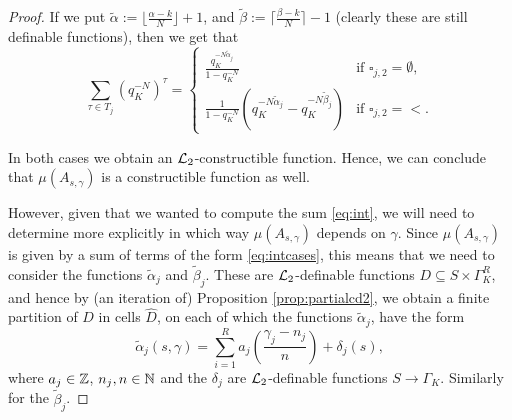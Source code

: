 \begin{proof}
If we put $\tilde{\alpha}:= \lfloor\frac{\alpha -k}{N}\rfloor+1$, and $\tilde{\beta}:= \lceil\frac{\beta -k}{N}\rceil-1$ (clearly these are still definable functions), then we get that
\begin{equation}\label{eq:intcases} \sum_{\tau \in T_j} (q_K^{-N})^\tau = \left\{
\begin{array}{ll}
\frac{q_K^{-N\tilde{\alpha}_j}}{1-q_K^{-N}} & \text{if\ \ } \square_{j,2} = \emptyset,\\ %
\frac{1}{1-q_K^{-N}}(q_K^{-N\tilde{\alpha}_j}-q_K^{-N\tilde{\beta}_j}) & \text{if \ \ } \square_{j,2} = <.
\end{array}\right.\end{equation}


In both cases we obtain an $\mathcal{L}_2$-constructible function. Hence, we can conclude that $\mu(A_{s, \gamma})$ is a constructible function as well.

However, given that we wanted to compute the sum \eqref{eq:int}, we will need to determine more explicitly in which way $\mu(A_{s, \gamma})$ depends on $\gamma$. Since $\mu(A_{s, \gamma})$ is given by a sum of terms of the form \eqref{eq:intcases}, this means that we need to consider the functions $\tilde{\alpha}_j$ and $\tilde{\beta}_j$. These are $\mathcal{L}_2$-definable functions $D \subseteq S \times \Gamma_K^R$, and hence by (an iteration of) Proposition \ref{prop:partialcd2}, we obtain a finite partition of $D$ in cells $\widehat{D}$, on each of which the functions $\tilde{\alpha}_j$,  have the form
\[\tilde{\alpha}_j(s,\gamma) = \sum_{i=1}^R a_j\left(\frac{\gamma_j-n_j}{n}\right) + \delta_j(s),\]
where $a_j \in {{\mathbb Z}}$, $n_j, n \in {{\mathbb N}}$ and the $\delta_j$ are $\mathcal{L}_2$-definable functions $S \to \Gamma_K$. Similarly for the $\tilde{\beta}_j$. 


\end{proof}
